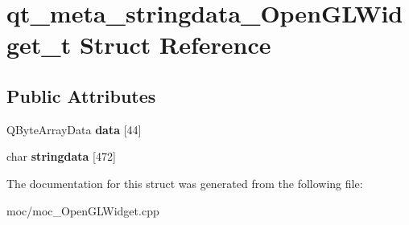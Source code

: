 \hypertarget{structqt__meta__stringdata___open_g_l_widget__t}{\section{qt\-\_\-meta\-\_\-stringdata\-\_\-\-Open\-G\-L\-Widget\-\_\-t Struct Reference}
\label{structqt__meta__stringdata___open_g_l_widget__t}
}
\subsection*{Public Attributes}
\begin{DoxyCompactItemize}
\item 
\hypertarget{structqt__meta__stringdata___open_g_l_widget__t_a605d0e49bd6082e25748f24ffa29b54c}{Q\-Byte\-Array\-Data {\bfseries data} \mbox{[}44\mbox{]}}\label{structqt__meta__stringdata___open_g_l_widget__t_a605d0e49bd6082e25748f24ffa29b54c}

\item 
\hypertarget{structqt__meta__stringdata___open_g_l_widget__t_a87d138a16a2a0d2bf6249092e86eb0d1}{char {\bfseries stringdata} \mbox{[}472\mbox{]}}\label{structqt__meta__stringdata___open_g_l_widget__t_a87d138a16a2a0d2bf6249092e86eb0d1}

\end{DoxyCompactItemize}


The documentation for this struct was generated from the following file\-:\begin{DoxyCompactItemize}
\item 
moc/moc\-\_\-\-Open\-G\-L\-Widget.\-cpp\end{DoxyCompactItemize}
